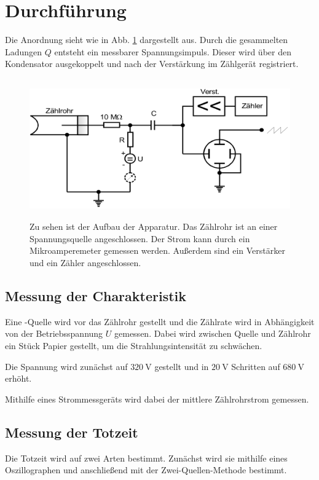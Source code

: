 \section{Durchführung}
\label{sec:Durchführung}

Die Anordnung sieht wie in Abb. \ref{fig:aufbau} dargestellt aus. Durch die gesammelten Ladungen $Q$ entsteht ein messbarer Spannungsimpuls. Dieser wird über den Kondensator ausgekoppelt und nach der Verstärkung im Zählgerät registriert.

\begin{figure}
    \centering
    \includegraphics[width=12cm, height=6cm]{build/aufbau.png}
    \caption{Zu sehen ist der Aufbau der Apparatur. Das Zählrohr ist an einer Spannungsquelle angeschlossen. Der Strom kann durch ein Mikroamperemeter gemessen werden. Außerdem sind ein Verstärker und ein Zähler angeschlossen. \cite{V703}}
    \label{fig:aufbau}
\end{figure}

\subsection{Messung der Charakteristik}
Eine \beta-Quelle wird vor das Zählrohr gestellt und die Zählrate wird in Abhängigkeit von der Betriebsspannung $U$ gemessen. Dabei wird zwischen Quelle und Zählrohr ein Stück Papier gestellt, um die Strahlungsintensität zu schwächen.

\noindent Die Spannung wird zunächst auf $\SI{320}{\volt}$ gestellt und in $\SI{20}{\volt}$ Schritten auf $\SI{680}{\volt}$ erhöht.

\noindent Mithilfe eines Strommessgeräts wird dabei der mittlere Zählrohrstrom gemessen.


\subsection{Messung der Totzeit}
Die Totzeit wird auf zwei Arten bestimmt. Zunächst wird sie mithilfe eines Oszillographen und anschließend mit der Zwei-Quellen-Methode bestimmt.

